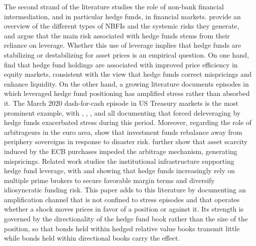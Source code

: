 \documentclass[english, 11pt, oneside]{article}
\begin{document}
The second strand of the literature studies the role of non-bank financial intermediation, and in particular hedge funds, in financial markets. \citet{aramonte2023} provide an overview of the different types of NBFIs and the systemic risks they generate, and argue that the main risk associated with hedge funds stems from their reliance on leverage. Whether this use of leverage implies that hedge funds are stabilizing or destabilizing for asset prices is an empirical question. On one hand, \citet{cao2018} find that hedge fund holdings are associated with improved price efficiency in equity markets, consistent with the view that hedge funds correct mispricings and enhance liquidity. On the other hand, a growing literature documents episodes in which leveraged hedge fund positioning has amplified stress rather than absorbed it. The March 2020 dash-for-cash episode in US Treasury markets is the most prominent example, with \citet{barth2025}, \citet{kruttli2025}, \citet{kashyap2025}, and \citet{barone2023} all documenting that forced deleveraging by hedge funds exacerbated stress during this period. Moreover, regarding the role of arbitrageurs in the euro area, \citet{anaya2025} show that investment funds rebalance away from periphery sovereigns in response to disaster risk. \citet{pelizzon2025} further show that asset scarcity induced by the ECB purchases impeded the arbitrage mechanism, generating mispricings. Related work studies the institutional infrastructure supporting hedge fund leverage, with \citet{dahlquist2023} and \citet{bittner2025} showing that hedge funds increasingly rely on multiple prime brokers to secure favorable margin terms and diversify idiosyncratic funding risk. This paper adds to this literature by documenting an amplification channel that is not confined to stress episodes and that operates whether a shock moves prices in favor of a position or against it. Its strength is governed by the directionality of the hedge fund book rather than the size of the position, so that bonds held within hedged relative value books transmit little while bonds held within directional books carry the effect.
\end{document}
